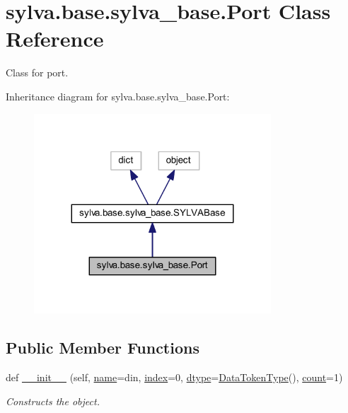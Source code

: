 \hypertarget{classsylva_1_1base_1_1sylva__base_1_1_port}{}\section{sylva.\+base.\+sylva\+\_\+base.\+Port Class Reference}
\label{classsylva_1_1base_1_1sylva__base_1_1_port}


Class for port.  




Inheritance diagram for sylva.\+base.\+sylva\+\_\+base.\+Port\+:
\nopagebreak
\begin{figure}[H]
\begin{center}
\leavevmode
\includegraphics[width=251pt]{classsylva_1_1base_1_1sylva__base_1_1_port__inherit__graph}
\end{center}
\end{figure}
\subsection*{Public Member Functions}
\begin{DoxyCompactItemize}
\item 
def \hyperlink{classsylva_1_1base_1_1sylva__base_1_1_port_a89c3b6366376207690227422325088f3}{\+\_\+\+\_\+init\+\_\+\+\_\+} (self, \hyperlink{classsylva_1_1base_1_1sylva__base_1_1_port_a4e52c67462a68c12e544a8e95f065993}{name}=\textquotesingle{}din\textquotesingle{}, \hyperlink{classsylva_1_1base_1_1sylva__base_1_1_port_a36d850a63a97265c2a611d2387cf8491}{index}=0, \hyperlink{classsylva_1_1base_1_1sylva__base_1_1_port_a442668943cd208f89f54bb6613b4f514}{dtype}=\hyperlink{classsylva_1_1base_1_1sylva__base_1_1_data_token_type}{Data\+Token\+Type}(), \hyperlink{classsylva_1_1base_1_1sylva__base_1_1_port_a3d01efab6495163880ccf499970f62fe}{count}=1)
\begin{DoxyCompactList}\small\item\em Constructs the object. \end{DoxyCompactList}\end{DoxyCompactItemize}
